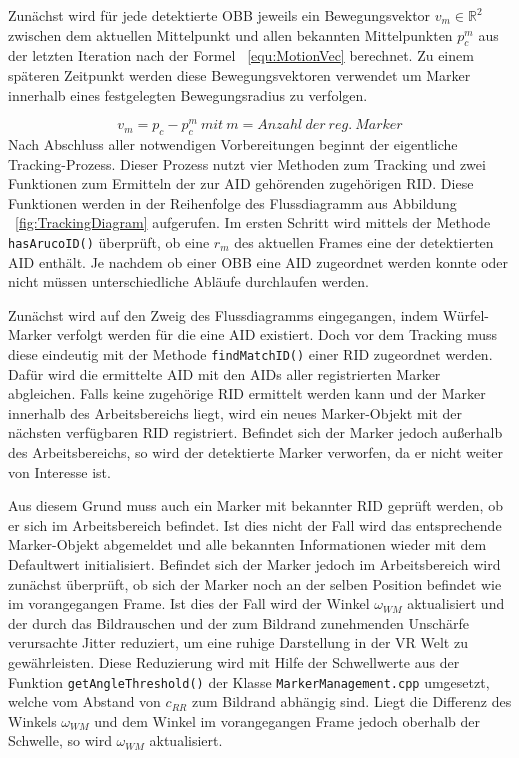 Zunächst wird für jede detektierte OBB jeweils ein Bewegungsvektor $v_m \in \mathbb{R}^2$ zwischen dem aktuellen Mittelpunkt und allen bekannten Mittelpunkten $p_c^{m}$ aus der letzten Iteration nach der Formel ~\ref{equ:MotionVec} berechnet. Zu einem späteren Zeitpunkt werden diese Bewegungsvektoren verwendet um Marker innerhalb eines festgelegten Bewegungsradius zu verfolgen. 

\begin{equation}
\label{equ:MotionVec}
v_m = p_c - p_c^m \ mit \ m= Anzahl \ der \ reg. \ Marker
\end{equation}
Nach Abschluss aller notwendigen Vorbereitungen beginnt der eigentliche Tracking-Prozess. Dieser Prozess nutzt vier Methoden zum Tracking und zwei Funktionen zum Ermitteln der zur AID gehörenden zugehörigen RID. Diese Funktionen werden in der Reihenfolge des Flussdiagramm aus Abbildung ~\ref{fig:TrackingDiagram} aufgerufen. Im ersten Schritt wird mittels der Methode \texttt{has\-Aruco\-ID()} überprüft, ob eine $r_m$ des aktuellen Frames eine der detektierten AID enthält. Je nachdem ob einer OBB eine AID zugeordnet werden konnte oder nicht müssen unterschiedliche Abläufe durchlaufen werden.

Zunächst wird auf den Zweig des Flussdiagramms eingegangen, indem Würfel-Marker verfolgt werden für die eine AID existiert. Doch vor dem Tracking muss diese eindeutig mit der Methode \texttt{find\-Match\-ID()} einer RID zugeordnet werden. Dafür wird die ermittelte AID mit den AIDs aller registrierten Marker abgleichen. Falls keine zugehörige RID ermittelt werden kann und der Marker innerhalb des Arbeitsbereichs liegt, wird ein neues Marker-Objekt mit der nächsten verfügbaren RID registriert. Befindet sich der Marker jedoch außerhalb des Arbeitsbereichs, so wird der detektierte Marker verworfen, da er nicht weiter von Interesse ist.

Aus diesem Grund muss auch ein Marker mit bekannter RID geprüft werden, ob er sich im Arbeitsbereich befindet. Ist dies nicht der Fall wird das entsprechende Marker-Objekt abgemeldet und alle bekannten Informationen wieder mit dem Defaultwert initialisiert. Befindet sich der Marker jedoch im Arbeitsbereich wird zunächst überprüft, ob sich der Marker noch an der selben Position befindet wie im vorangegangen Frame. Ist dies der Fall wird der Winkel $\omega_{WM}$ aktualisiert und der durch das Bildrauschen und der zum Bildrand zunehmenden Unschärfe verursachte Jitter reduziert, um eine ruhige Darstellung in der VR Welt zu gewährleisten. Diese Reduzierung wird mit Hilfe der Schwellwerte aus der Funktion \texttt{get\-Angle\-Threshold()} der Klasse \texttt{Marker\-Management.cpp} umgesetzt, welche vom Abstand von $c_{RR}$ zum Bildrand abhängig sind. Liegt die Differenz des Winkels $\omega_{WM}$ und dem Winkel im vorangegangen Frame jedoch oberhalb der Schwelle, so wird $\omega_{WM}$ aktualisiert.

